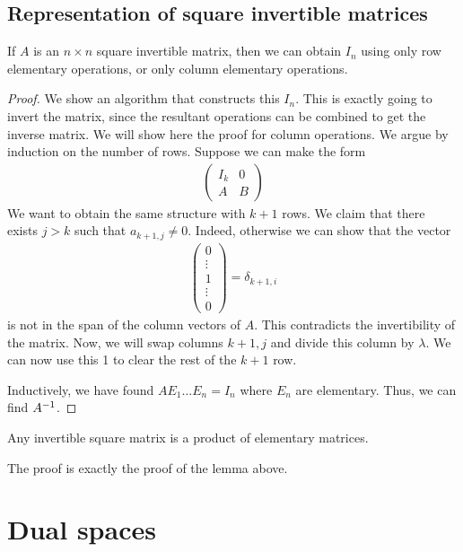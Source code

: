     \subsection{Representation of square invertible matrices}
    \begin{lemma}
        If $A$ is an $n \times n$ square invertible matrix, then we can obtain $I_n$ using only row elementary operations, or only column elementary operations.
    \end{lemma}
    \begin{proof}
        We show an algorithm that constructs this $I_n$.
        This is exactly going to invert the matrix, since the resultant operations can be combined to get the inverse matrix.
        We will show here the proof for column operations.
        We argue by induction on the number of rows.
        Suppose we can make the form
        \begin{align*}
            \begin{pmatrix} I_k & 0 \\ A & B \end{pmatrix}
        \end{align*}
        We want to obtain the same structure with $k+1$ rows.
        We claim that there exists $j > k$ such that $a_{k+1,j} \neq 0$.
        Indeed, otherwise we can show that the vector
        \begin{align*}
            \begin{pmatrix} 0 \\ \vdots \\ 1 \\ \vdots \\ 0 \end{pmatrix} = \delta_{k+1,i}
        \end{align*}
        is not in the span of the column vectors of $A$.
        This contradicts the invertibility of the matrix.
        Now, we will swap columns $k+1, j$ and divide this column by $\lambda$.
        We can now use this 1 to clear the rest of the $k+1$ row.

        Inductively, we have found $A E_1 \dots E_n = I_n$ where $E_n$ are elementary.
        Thus, we can find $A^{-1}$.
    \end{proof}
    \begin{proposition}
        Any invertible square matrix is a product of elementary matrices.
    \end{proposition}
    The proof is exactly the proof of the lemma above.
    
    \section{Dual spaces}
